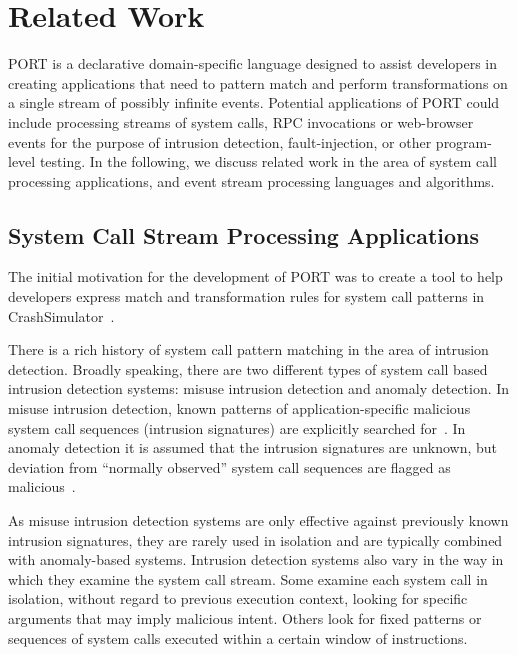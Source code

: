 \section{Related Work}
\label{SEC:related-work}

PORT is a declarative domain-specific language designed to
assist developers in creating
applications that need to pattern match and perform
transformations on a single stream of possibly infinite events.
Potential applications
of PORT could include
processing streams of system calls, RPC invocations or
web-browser events for the purpose of intrusion detection, fault-injection, or
other program-level testing. In the following, we discuss
related work in the area of system call processing applications,
and event stream processing languages and algorithms.

\subsection{System Call Stream Processing Applications}
The
initial motivation for the development of PORT was to create a tool to help
developers express match and transformation rules for system call patterns in
CrashSimulator~\cite{DBLP:conf/issre/MooreCFW19}.

There is a rich history of system call pattern
matching in the area of intrusion detection.  Broadly speaking, there are two
different types of system call based intrusion detection systems: misuse
intrusion detection and anomaly detection. In misuse intrusion
detection, known patterns of application-specific malicious system call
sequences (intrusion signatures) are explicitly searched
for~\cite{GARCIATEODORO200918}.
In anomaly
detection it is assumed that the intrusion signatures are unknown, but deviation
from “normally observed” system call sequences are flagged as
malicious~\cite{DBLP:conf/sp/ForrestHSL96}.

As misuse intrusion detection systems are only
effective against previously known intrusion signatures, they are rarely used in
isolation and are typically combined with anomaly-based systems.
Intrusion
detection systems also vary in the way in which they examine the system call
stream.
Some examine each system call in isolation,
without regard to previous
execution context,
looking for specific arguments that may imply malicious
intent.
Others look for fixed patterns or sequences of system calls executed
within a certain window of instructions.

